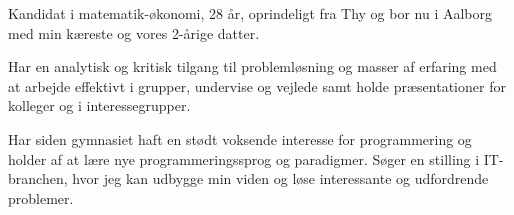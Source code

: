 \documentclass[9pt]{template/developercv}
\begin{document}
\vspace{1em}


\begin{minipage}[t]{0.5\textwidth}
  \vspace{-\baselineskip}

  Kandidat i matematik-økonomi, 28 år, oprindeligt fra Thy og bor nu i Aalborg med min kæreste og vores 2-årige datter.

  \medskip
  Har en analytisk og kritisk tilgang til problemløsning og masser af erfaring med at arbejde effektivt i grupper, undervise og vejlede samt holde præsentationer for kolleger og i interessegrupper.

  \medskip
  Har siden gymnasiet haft en stødt voksende interesse for programmering og holder af at lære nye programmeringssprog og paradigmer.
  Søger en stilling i IT-branchen, hvor jeg kan udbygge min viden og løse interessante og udfordrende problemer.

\end{minipage}
\hfill
\begin{minipage}[t]{0.23\textwidth}
  \vspace{-\baselineskip}
  \begin{barchart}{2.5}
  \end{barchart}
\end{minipage}
\hfill
\begin{minipage}[t]{0.17\textwidth}
  \vspace{-\baselineskip}
  \begin{barchart}{2.5}
  \end{barchart}
\end{minipage}

\begin{center}
\end{center}
\end{document}
